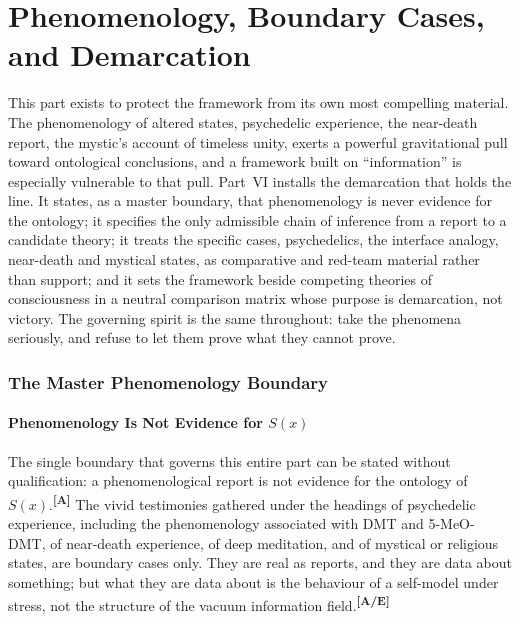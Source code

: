 \documentclass[12pt,a4paper,twoside]{article}
\theoremstyle{plain}
\theoremstyle{definition}
\theoremstyle{remark}
\newcommand{\catmark}[1]{\textsuperscript{\textsf{\textbf{[#1]}}}}
\begin{document}
\part{Phenomenology, Boundary Cases, and Demarcation}
\label{part:phenomenology-demarcation}

\noindent This part exists to protect the framework from its own most compelling material. The phenomenology of altered states, psychedelic experience, the near-death report, the mystic's account of timeless unity, exerts a powerful gravitational pull toward ontological conclusions, and a framework built on ``information'' is especially vulnerable to that pull. Part~VI installs the demarcation that holds the line. It states, as a master boundary, that phenomenology is never evidence for the ontology; it specifies the only admissible chain of inference from a report to a candidate theory; it treats the specific cases, psychedelics, the interface analogy, near-death and mystical states, as comparative and red-team material rather than support; and it sets the framework beside competing theories of consciousness in a neutral comparison matrix whose purpose is demarcation, not victory. The governing spirit is the same throughout: take the phenomena seriously, and refuse to let them prove what they cannot prove.

\section{The Master Phenomenology Boundary}
\label{sec:master-phenomenology-boundary}

\subsection{Phenomenology Is Not Evidence for \texorpdfstring{$S(x)$}{S(x)}}
\label{subsec:phenomenology-not-evidence}

The single boundary that governs this entire part can be stated without qualification: a phenomenological report is not evidence for the ontology of $S(x)$.\catmark{A} The vivid testimonies gathered under the headings of psychedelic experience, including the phenomenology associated with DMT and 5-MeO-DMT, of near-death experience, of deep meditation, and of mystical or religious states, are boundary cases only. They are real as reports, and they are data about something; but what they are data about is the behaviour of a self-model under stress, not the structure of the vacuum information field.\catmark{A/E}
\end{document}
